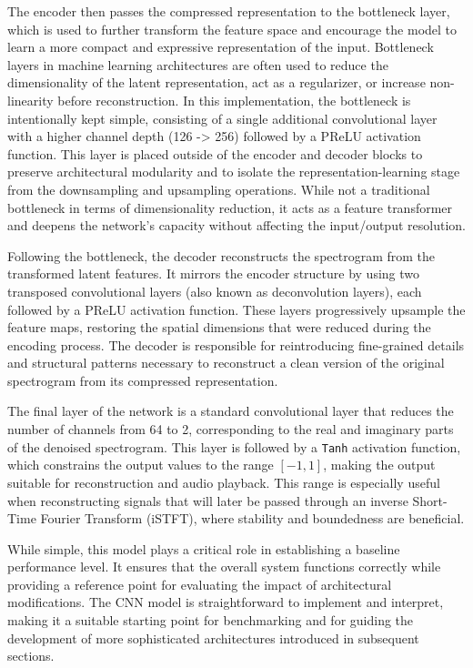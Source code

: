The encoder then passes the compressed representation to the bottleneck layer, which is used to further transform the feature space and encourage the model to learn a more compact and expressive representation of the input. Bottleneck layers in machine learning architectures are often used to reduce the dimensionality of the latent representation, act as a regularizer, or increase non-linearity before reconstruction. In this implementation, the bottleneck is intentionally kept simple, consisting of a single additional convolutional layer with a higher channel depth (126 -> 256) followed by a PReLU activation function. This layer is placed outside of the encoder and decoder blocks to preserve architectural modularity and to isolate the representation-learning stage from the downsampling and upsampling operations. While not a traditional bottleneck in terms of dimensionality reduction, it acts as a feature transformer and deepens the network's capacity without affecting the input/output resolution.

Following the bottleneck, the decoder reconstructs the spectrogram from the transformed latent features. It mirrors the encoder structure by using two transposed convolutional layers (also known as deconvolution layers), each followed by a PReLU activation function. These layers progressively upsample the feature maps, restoring the spatial dimensions that were reduced during the encoding process. The decoder is responsible for reintroducing fine-grained details and structural patterns necessary to reconstruct a clean version of the original spectrogram from its compressed representation.

The final layer of the network is a standard convolutional layer that reduces the number of channels from 64 to 2, corresponding to the real and imaginary parts of the denoised spectrogram. This layer is followed by a \texttt{Tanh} activation function, which constrains the output values to the range \([-1, 1]\), making the output suitable for reconstruction and audio playback. This range is especially useful when reconstructing signals that will later be passed through an inverse Short-Time Fourier Transform (iSTFT), where stability and boundedness are beneficial.

While simple, this model plays a critical role in establishing a baseline performance level. It ensures that the overall system functions correctly while providing a reference point for evaluating the impact of architectural modifications. The CNN model is straightforward to implement and interpret, making it a suitable starting point for benchmarking and for guiding the development of more sophisticated architectures introduced in subsequent sections.

